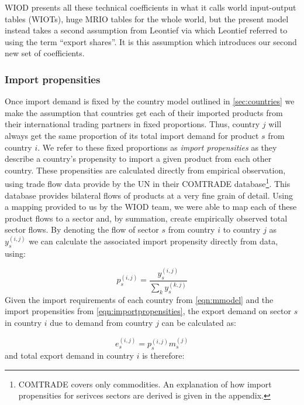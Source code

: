 \documentclass[a4paper]{article}
\begin{document}
WIOD presents all these technical coefficients in what it calls world input-output tables (WIOTs), huge MRIO tables for the whole world, but the present model instead takes a second assumption from Leontief via \textcite{duchin_international_2004} which Leontief referred to using the term ``export shares''.
It is this assumption which introduces our second new set of coefficients.

\subsubsection*{Import propensities}
Once import demand is fixed by the country model outlined in \cref{sec:countries} we make the assumption that countries get each of their imported products from their international trading partners in fixed proportions.
Thus, country $j$ will always get the same proportion of its total import demand for product $s$ from country $i$.
We refer to these fixed proportions as \textit{import propensities} as they describe a country's propensity to import a given product from each other country.
These propensities are calculated directly from empirical observation, using trade flow data provide by the UN in their COMTRADE database\footnote{COMTRADE covers only commodities. An explanation of how import propensities for serivces sectors are derived is given in the appendix.}.
This database provides bilateral flows of products at a very fine grain of detail.
Using a mapping provided to us by the WIOD team, we were able to map each of these product flows to a sector and, by summation, create empirically observed total sector flows.
By denoting the flow of sector $s$ from country $i$ to country $j$ as $y_s^{(i,j)}$ we can calculate the associated import propensity directly from data, using:

\begin{equation}\label{eqn:importpropensities}
p^{(i,j)}_s = \frac{y^{(i,j)}_s}{\sum_k{y^{(k,j)}_s}}
\end{equation}
Given the import requirements of each country from \cref{eqn:mmodel} and the import propensities from \cref{eqn:importpropensities}, the export demand on sector $s$ in country $i$ due to demand from country $j$ can be calculated as:

\begin{equation}
e_s^{(i,j)} = p_s^{(i,j)}m_s^{(j)}
\end{equation}
and total export demand in country $i$ is therefore:
\end{document}
